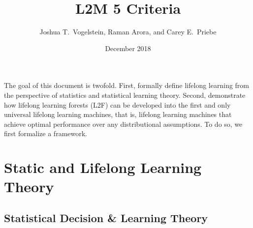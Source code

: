 \documentclass{article}
\title{L2M 5 Criteria}
\author{Joshua T.~Vogelstein, Raman Arora, and Carey E.~Priebe}
\affil{Johns Hopkins University}
\date{December 2018}
\begin{document}
\maketitle

The goal of this document is twofold. First, formally define lifelong learning from the perspective of statistics and statistical learning theory.  Second, demonstrate how lifelong learning forests (L2F) can be developed into the first and only universal lifelong learning machines, that is, lifelong learning machines that achieve optimal performance over any distributional assumptions.  To do so, we first formalize a framework.    

\tableofcontents

\clearpage
\setcounter{section}{-1}
\section{Static and Lifelong Learning Theory}
\subsection{Statistical Decision \& Learning Theory}
\end{document}
